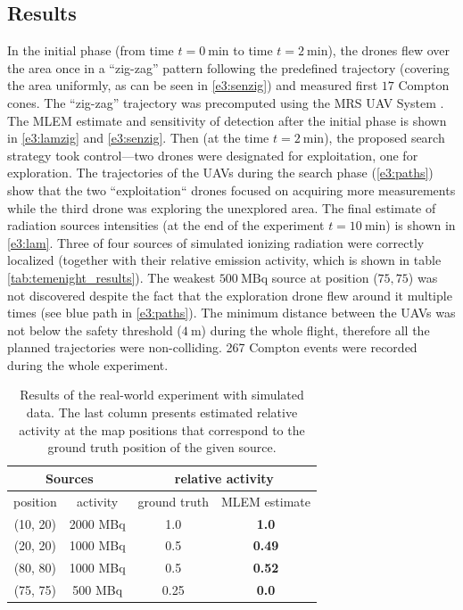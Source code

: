 
\subsection{Results}
In the initial phase (from time $t = \SI{0}{\minute}$ to time $t = \SI{2}{\minute}$), the drones flew over the area once in a ``zig-zag'' pattern following the predefined trajectory (covering the area uniformly, as can be seen in \autoref{e3:senzig}) and measured first $17$ Compton cones.
The ``zig-zag'' trajectory was precomputed using the MRS UAV System \cite{mrs_system}.
The \ac{MLEM} estimate and sensitivity of detection after the initial phase is shown in \autoref{e3:lamzig} and \autoref{e3:senzig}.
Then (at the time $t = \SI{2}{\minute}$), the proposed search strategy took control---two drones were designated for exploitation, one for exploration.
The trajectories of the \ac{UAV}s during the search phase (\autoref{e3:paths}) show that the two ``exploitation`` drones focused on acquiring more measurements while the third drone was exploring the unexplored area.
The final estimate of radiation sources intensities (at the end of the experiment $t = \SI{10}{\minute}$) is shown in \autoref{e3:lam}.
Three of four sources of simulated ionizing radiation were correctly localized (together with their relative emission activity, which is shown in table \autoref{tab:temenight_results}).
The weakest $\SI{500}{\mega\becquerel}$ source at position ($75, 75$) was not discovered despite the fact that the exploration drone flew around it multiple times (see blue path in \autoref{e3:paths}).
The minimum distance between the \ac{UAV}s was not below the safety threshold ($\SI{4}{\meter}$) during the whole flight, therefore all the planned trajectories were non-colliding.
267 Compton events were recorded during the whole experiment.
\begin{table}[htb]
\begin{center}
  \begin{tabular}{ |c|c|c|c| } 
 \hline
    \multicolumn{2}{|c}{Sources} &  \multicolumn{2}{|c|}{ relative activity } \\
 \hline
    position & activity & ground truth & MLEM estimate\\ 
 \hline
    (10, 20) & 2000 MBq & 1.0  & \textbf{1.0} \\ 
    (20, 20) & 1000 MBq &  0.5 & \textbf{0.49} \\ 
    (80, 80) & 1000 MBq &  0.5 & \textbf{0.52} \\ 
    (75, 75) & 500 MBq &  0.25 & \textbf{0.0} \\ 
 \hline
\end{tabular}
  \caption{Results of the real-world experiment with simulated data. The last column presents estimated relative activity at the map positions that correspond to the ground truth position of the given source.}
  \label{tab:temenight_results}
\end{center}
\end{table}

